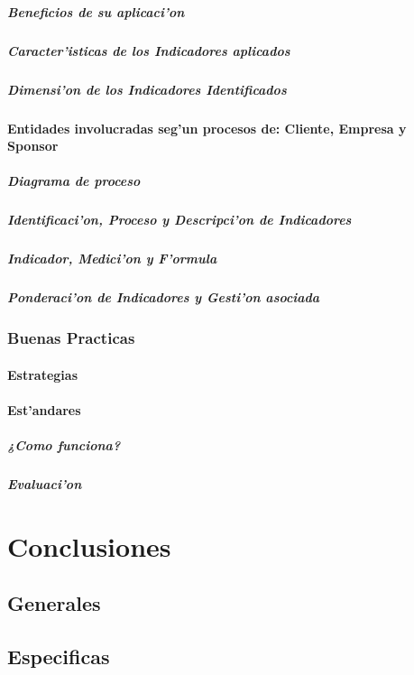 \documentclass[letterpaper,openright,10pt,oneside]{report}
\begin{document}
				\subsubsection{Beneficios de su aplicaci'on}
				\subsubsection{Caracter'isticas de los Indicadores aplicados}
				\subsubsection{Dimensi'on de los Indicadores Identificados}
			\subsection{Entidades involucradas seg'un procesos de: Cliente, Empresa y Sponsor}
				\subsubsection{Diagrama de proceso}
				\subsubsection{Identificaci'on, Proceso y Descripci'on de Indicadores}
				\subsubsection{Indicador, Medici'on y F'ormula}
				\subsubsection{Ponderaci'on de Indicadores y Gesti'on asociada}
		\section{Buenas Practicas}
			\subsection{Estrategias}
			\subsection{Est'andares}
				\subsubsection{¿Como funciona?}
				\subsubsection{Evaluaci'on}
\part{Conclusiones}
	\chapter{Generales}
	\chapter{Especificas}
\appendix
\clearpage
\end{document}
